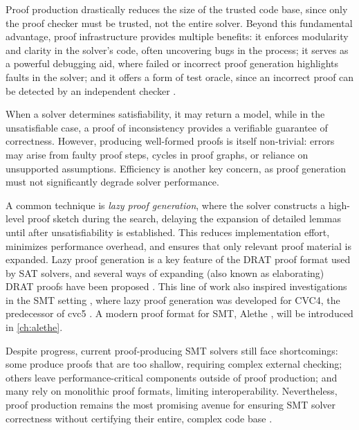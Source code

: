 Proof production drastically reduces the size of the trusted code base, since only the proof checker must be trusted, not the entire solver.
Beyond this fundamental advantage, proof infrastructure provides multiple benefits:  it enforces modularity and clarity in the solver’s code, often uncovering bugs in the process;
it serves as a powerful debugging aid, where failed or incorrect proof generation highlights faults in the solver;
and it offers a form of test oracle, since an incorrect proof can be detected  by an independent checker \cite{10.1007/978-3-319-66107-0_18}. 

When a solver determines satisfiability, it may return a model, while in the unsatisfiable case,  a proof of inconsistency provides a verifiable guarantee of correctness. 
However, producing well-formed proofs is itself non-trivial: errors may arise from faulty proof steps, cycles in proof graphs, or reliance on unsupported assumptions. 
Efficiency is another key concern, as proof generation must not significantly  degrade solver performance. 

A common technique is \emph{lazy proof generation}, where the solver constructs a high-level proof sketch  during the search, delaying the expansion of detailed lemmas until after unsatisfiability is established. 
This reduces implementation effort, minimizes performance overhead, and ensures that only  relevant proof material is expanded.
Lazy proof generation is a key feature of the DRAT \cite{drat} proof format used by SAT solvers, and several ways of expanding (also known as elaborating) DRAT proofs have been proposed \cite{10.1007/978-3-319-63046-5_14,DBLP:conf/cade/KieslRH18, 10.1007/978-3-319-63046-5_15}.
This line of work also inspired investigations in the SMT setting \cite{lazy-proof-smt}, where lazy proof generation was developed for CVC4, the predecessor of cvc5 \cite{cvc4}.
A modern proof format for SMT, Alethe \cite{alethe,alethe2}, will be introduced in \cref{ch:alethe}.

Despite progress, current proof-producing SMT solvers still face shortcomings:  some produce proofs that are too shallow, requiring complex external checking; 
others leave performance-critical components outside of proof production; 
and many rely on monolithic proof formats, limiting interoperability. 
Nevertheless, proof production remains the most promising avenue for ensuring SMT solver correctness  without certifying their entire, complex code base \cite{LFSC}.
